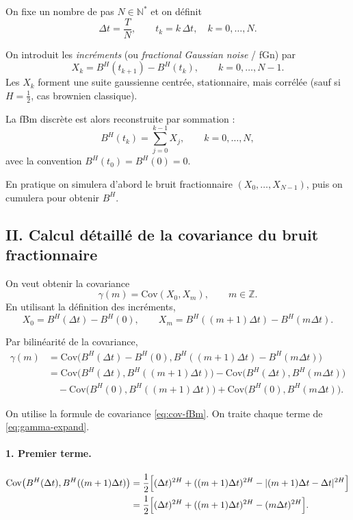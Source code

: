\documentclass[11pt,a4paper]{article}
\newcommand{\Cov}{\mathrm{Cov}}
\newcommand{\1}{\mathbf{1}}
\newcommand{\bH}{B^{H}}
\begin{document}
On fixe un nombre de pas $N\in\mathbb{N}^\ast$ et on définit
\begin{equation}
  \Delta t = \frac{T}{N},
  \qquad
  t_k = k\,\Delta t,\quad k=0,\dots,N.
\end{equation}

On introduit les \emph{incréments} (ou \emph{fractional Gaussian
noise} / fGn) par
\begin{equation}
  X_k = \bH(t_{k+1}) - \bH(t_k),
  \qquad k = 0,\dots,N-1.
\end{equation}
Les $X_k$ forment une suite gaussienne centrée, stationnaire, mais
corrélée (sauf si $H=\tfrac12$, cas brownien classique).

La fBm discrète est alors reconstruite par sommation :
\begin{equation}
  \bH(t_k)
  = \sum_{j=0}^{k-1} X_j,
  \qquad k=0,\dots,N,
\end{equation}
avec la convention $\bH(t_0)=\bH(0)=0$.

En pratique on simulera d'abord le bruit fractionnaire $(X_0,\dots,X_{N-1})$, puis
on cumulera pour obtenir $\bH$.

\subsection*{II. Calcul détaillé de la covariance du bruit fractionnaire}

On veut obtenir la covariance
\[
  \gamma(m) = \Cov(X_0,X_m),
  \qquad m\in\mathbb{Z}.
\]
En utilisant la définition des incréments,
\[
  X_0 = \bH(\Delta t) - \bH(0),
  \qquad
  X_m = \bH((m+1)\Delta t) - \bH(m\Delta t).
\]

Par bilinéarité de la covariance,
\begin{align}
  \gamma(m)
  &= \Cov\bigl(\bH(\Delta t)-\bH(0),
               \bH((m+1)\Delta t)-\bH(m\Delta t)\bigr) \\[0.3em]
  &= \Cov\bigl(\bH(\Delta t),\bH((m+1)\Delta t)\bigr)
   - \Cov\bigl(\bH(\Delta t),\bH(m\Delta t)\bigr) \nonumber\\
  &\quad - \Cov\bigl(\bH(0),\bH((m+1)\Delta t)\bigr)
   + \Cov\bigl(\bH(0),\bH(m\Delta t)\bigr). \label{eq:gamma-expand}
\end{align}

On utilise la formule de covariance \eqref{eq:cov-fBm}. On traite
chaque terme de \eqref{eq:gamma-expand}.

\paragraph{1. Premier terme.}
\begin{align}
  \Cov\bigl(\bH(\Delta t),\bH((m+1)\Delta t)\bigr)
  &= \frac{1}{2}\Bigl[(\Delta t)^{2H}
  + ((m+1)\Delta t)^{2H}
  - |(m+1)\Delta t - \Delta t|^{2H}\Bigr] \\
  &= \frac{1}{2}\Bigl[(\Delta t)^{2H}
  + ((m+1)\Delta t)^{2H}
  - (m\Delta t)^{2H}\Bigr].
\end{align}
\end{document}

